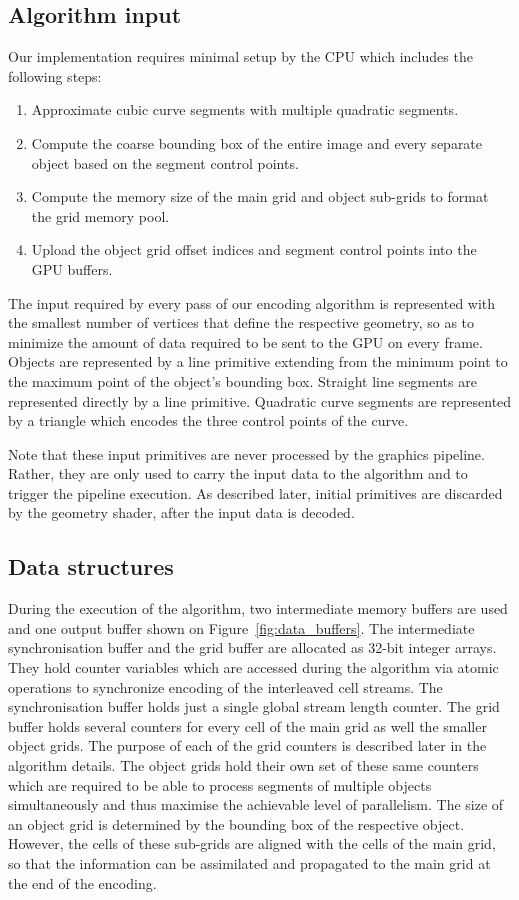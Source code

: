 \documentclass[11pt,a4paper,twoside]{article}
\begin{document}
\subsection {Algorithm input}

Our implementation requires minimal setup by the CPU which includes the following steps:

\begin {enumerate}
\item
Approximate cubic curve segments with multiple quadratic segments.
\item
Compute the coarse bounding box of the entire image and every separate object based on the segment control points.
\item
Compute the memory size of the main grid and object sub-grids to format the grid memory pool.
\item
Upload the object grid offset indices and segment control points into the GPU buffers.
\end {enumerate}

The input required by every pass of our encoding algorithm is represented with the smallest number of vertices that define the respective geometry, so as to minimize the amount of data required to be sent to the GPU on every frame. Objects are represented by a line primitive extending from the minimum point to the maximum point of the object's bounding box. Straight line segments are represented directly by a line primitive. Quadratic curve segments are represented by a triangle which encodes the three control points of the curve.

Note that these input primitives are never processed by the graphics pipeline. Rather, they are only used to carry the input data to the algorithm and to trigger the pipeline execution. As described later, initial primitives are discarded by the geometry shader, after the input data is decoded.

\subsection{Data structures}

During the execution of the algorithm, two intermediate memory buffers are used and one output buffer shown on Figure~\ref{fig:data_buffers}. The intermediate synchronisation buffer and the grid buffer are allocated as 32-bit integer arrays. They hold counter variables which are accessed during the algorithm via atomic operations to synchronize encoding of the interleaved cell streams. The synchronisation buffer holds just a single global stream length counter. The grid buffer holds several counters for every cell of the main grid as well the smaller object grids. The purpose of each of the grid counters is described later in the algorithm details. The object grids hold their own set of these same counters which are required to be able to process segments of multiple objects simultaneously and thus maximise the achievable level of parallelism. The size of an object grid is determined by the bounding box of the respective object. However, the cells of these sub-grids are aligned with the cells of the main grid, so that the information can be assimilated and propagated to the main grid at the end of the encoding.
\end{document}
